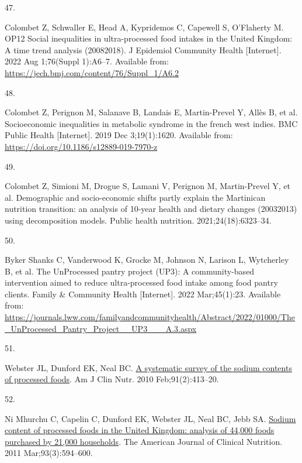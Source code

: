 \documentclass[
]{article}
\newlength{\cslhangindent}
\newlength{\csllabelwidth}
\newlength{\cslentryspacingunit} %
\newenvironment{CSLReferences}[2] %
 {%
  \setlength{\parindent}{0pt}
  \ifodd #1
  \let\oldpar\par
  \def\par{\hangindent=\cslhangindent\oldpar}
  \fi
  \setlength{\parskip}{#2\cslentryspacingunit}
 }%
 {}
\newcommand{\CSLLeftMargin}[1]{\parbox[t]{\csllabelwidth}{#1}}
\newcommand{\CSLRightInline}[1]{\parbox[t]{\linewidth - \csllabelwidth}{#1}\break}
\begin{document}
\begin{CSLReferences}{0}{0}
\leavevmode{}%
\CSLLeftMargin{47. }%
\CSLRightInline{Colombet Z, Schwaller E, Head A, Kypridemos C, Capewell
S, O'Flaherty M. OP12 Social inequalities in ultra-processed food
intakes in the United Kingdom: A time trend analysis
(2008{\textendash}2018). J Epidemiol Community Health {[}Internet{]}.
2022 Aug 1;76(Suppl 1):A6--7. Available from:
\url{https://jech.bmj.com/content/76/Suppl_1/A6.2}}

\leavevmode{}%
\CSLLeftMargin{48. }%
\CSLRightInline{Colombet Z, Perignon M, Salanave B, Landais E,
Martin-Prevel Y, Allès B, et al. Socioeconomic inequalities in metabolic
syndrome in the french west indies. BMC Public Health {[}Internet{]}.
2019 Dec 3;19(1):1620. Available from:
\url{https://doi.org/10.1186/s12889-019-7970-z}}

\leavevmode{}%
\CSLLeftMargin{49. }%
\CSLRightInline{Colombet Z, Simioni M, Drogue S, Lamani V, Perignon M,
Martin-Prevel Y, et al. Demographic and socio-economic shifts partly
explain the Martinican nutrition transition: an analysis of 10-year
health and dietary changes (2003{\textendash}2013) using decomposition
models. Public health nutrition. 2021;24(18):6323--34. }

\leavevmode{}%
\CSLLeftMargin{50. }%
\CSLRightInline{Byker Shanks C, Vanderwood K, Grocke M, Johnson N,
Larison L, Wytcherley B, et al. The UnProcessed pantry project (UP3): A
community-based intervention aimed to reduce ultra-processed food intake
among food pantry clients. Family \& Community Health {[}Internet{]}.
2022 Mar;45(1):23. Available from:
\url{https://journals.lww.com/familyandcommunityhealth/Abstract/2022/01000/The_UnProcessed_Pantry_Project__UP3___A.3.aspx}}

\leavevmode{}%
\CSLLeftMargin{51. }%
\CSLRightInline{Webster JL, Dunford EK, Neal BC.
\href{https://doi.org/10.3945/ajcn.2009.28688}{A systematic survey of
the sodium contents of processed foods}. Am J Clin Nutr. 2010
Feb;91(2):413--20. }

\leavevmode{}%
\CSLLeftMargin{52. }%
\CSLRightInline{Ni Mhurchu C, Capelin C, Dunford EK, Webster JL, Neal
BC, Jebb SA. \href{https://doi.org/10.3945/ajcn.110.004481}{Sodium
content of processed foods in the United Kingdom: analysis of 44,000
foods purchased by 21,000 households}. The American Journal of Clinical
Nutrition. 2011 Mar;93(3):594--600. }


\end{CSLReferences}
\end{document}
